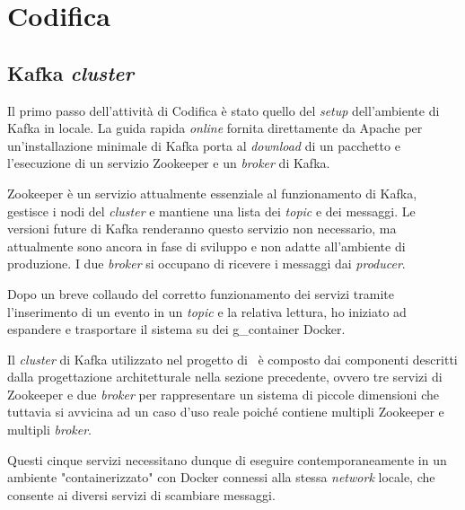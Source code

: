 




\section{Codifica}

\subsection{Kafka \textit{cluster}}

Il primo passo dell'attività di Codifica è stato quello del \textit{setup} dell'ambiente di Kafka in locale.
La guida rapida \textit{online} fornita direttamente da Apache per un'installazione minimale di Kafka porta al \textit{download} di un pacchetto e l'esecuzione di un servizio Zookeeper e un \textit{broker} di Kafka.

Zookeeper è un servizio attualmente essenziale al funzionamento di Kafka, gestisce i nodi del \textit{cluster} e mantiene una lista dei \textit{topic} e dei messaggi.
Le versioni future di Kafka renderanno questo servizio non necessario, ma attualmente sono ancora in fase di sviluppo e non adatte all'ambiente di produzione.
I due \textit{broker} si occupano di ricevere i messaggi dai \textit{producer}.

Dopo un breve collaudo del corretto funzionamento dei servizi tramite l'inserimento di un evento in un \textit{topic} e la relativa lettura, ho iniziato ad espandere e trasportare il sistema su dei \gls{g_container} Docker.

Il \textit{cluster} di Kafka utilizzato nel progetto di \stage\ è composto dai componenti descritti dalla progettazione architetturale nella sezione precedente, ovvero tre servizi di Zookeeper e due \textit{broker} per rappresentare un sistema di piccole dimensioni che tuttavia si avvicina ad un caso d'uso reale poiché contiene multipli Zookeeper e multipli \textit{broker}.

Questi cinque servizi necessitano dunque di eseguire contemporaneamente in un ambiente "containerizzato" con Docker connessi alla stessa \textit{network} locale, che consente ai diversi servizi di scambiare messaggi.

